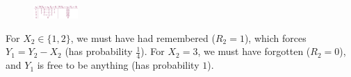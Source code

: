 \begin{figure}
    \includegraphics[width=0.15\textwidth]{topics/Bayesnet_problem_ans.jpg}
\end{figure}
For $X_2 \in \{1,2\}$, we must have had remembered ($R_2 = 1$), which forces
$Y_1 = Y_2 - X_2$ (has probability $\frac{1}{4}$). For $X_2=3$, we must have
forgotten ($R_2 = 0$), and $Y_1$ is free to be anything (has probability $1$).
